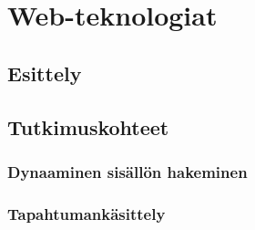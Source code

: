 \chapter{Web-teknologiat}

\section{Esittely}

\section{Tutkimuskohteet}

\subsection{Dynaaminen sisällön hakeminen}

\subsection{Tapahtumankäsittely}
